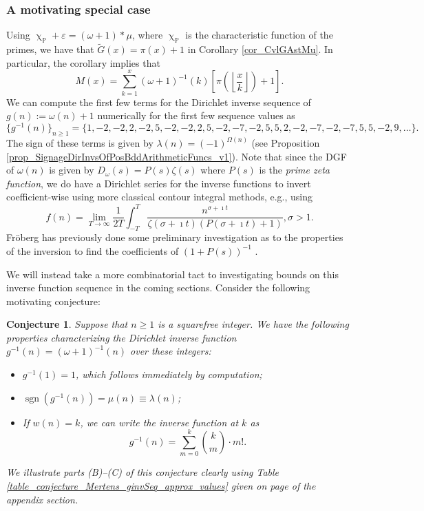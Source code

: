 \documentclass[11pt,reqno,a4letter]{article}
\numberwithin{figure}{section}
\numberwithin{table}{section}
\renewcommand{\chi}{\upchi}
\newcommand{\Floor}[2]{\ensuremath{\left\lfloor \frac{#1}{#2} \right\rfloor}}
\theoremstyle{plain}
\newtheorem{conjecture}[theorem]{Conjecture}
\numberwithin{theorem}{section}
\theoremstyle{definition}
\begin{document}
\subsubsection{A motivating special case} 
\label{example_InvertingARecRelForMx_Intro}
 
Using $\chi_{\mathbb{P}} + \varepsilon = (\omega + 1) \ast \mu$, 
where $\chi_{\mathbb{P}}$ is the characteristic 
function of the primes, we have that $\widetilde{G}(x) = \pi(x) + 1$ in 
Corollary \ref{cor_CvlGAstMu}. 
In particular, the corollary implies that 
\begin{equation} 
\label{eqn_Mx_gInvnPixk_formula} 
M(x) = \sum_{k=1}^{x} (\omega+1)^{-1}(k) \left[\pi\left(\Floor{x}{k}\right) + 1\right]. 
\end{equation} 
We can compute the first few terms for the
Dirichlet inverse sequence of 
$g(n) := \omega(n) + 1$ numerically for the first few sequence values as 
\[
\{g^{-1}(n)\}_{n \geq 1} = \{1, -2, -2, 2, -2, 5, -2, -2, 2, 5, -2, -7, -2, 5, 5, 2, -2, -7, -2, 
     -7, 5, 5, -2, 9, \ldots \}. 
\] 
The sign of these terms is given by $\lambda(n) = (-1)^{\Omega(n)}$ 
(see Proposition \ref{prop_SignageDirInvsOfPosBddArithmeticFuncs_v1}). 
Note that since the DGF of $\omega(n)$ is given by 
$D_{\omega}(s) = P(s) \zeta(s)$ where $P(s)$ is the \emph{prime zeta function}, we do have a 
Dirichlet series for the inverse functions to invert coefficient-wise using more classical 
contour integral methods, e.g., using \cite[\S 11]{APOSTOLANUMT} 
\[
f(n) = \lim_{T \rightarrow \infty} \frac{1}{2T} \int_{-T}^{T} 
     \frac{n^{\sigma+\imath t}}{\zeta(\sigma+\imath t)(P(\sigma+\imath t) + 1)}, \sigma > 1. 
\]
Fr\"oberg has previously done some preliminary investigation as to the properties of the 
inversion to find the coefficients of $(1+P(s))^{-1}$ \cite{FROBERG-1968}. 

We will instead take a more combinatorial tact to investigating bounds on this inverse function 
sequence in the coming sections. 
Consider the following motivating conjecture: 

\begin{conjecture}
\label{lemma_gInv_MxExample} 
Suppose that $n \geq 1$ is a squarefree integer. We have the following properties characterizing the 
Dirichlet inverse function $g^{-1}(n) = (\omega+1)^{-1}(n)$ over these integers: 
\begin{itemize} 

\item[(A)] $g^{-1}(1) = 1$, which follows immediately by computation; 
\item[(B)] $\operatorname{sgn}(g^{-1}(n)) = \mu(n) \equiv \lambda(n)$; 
\item[(C)] If $w(n) = k$, we can write the inverse function at $k$ as 
     \[
     g^{-1}(n) = \sum_{m=0}^{k} \binom{k}{m} \cdot m!. 
     \]
\end{itemize} 
We illustrate parts (B)--(C) of this conjecture clearly using 
Table \ref{table_conjecture_Mertens_ginvSeq_approx_values} given on 
page \pageref{table_conjecture_Mertens_ginvSeq_approx_values} of the appendix section. 
\end{conjecture} 
\end{document}

